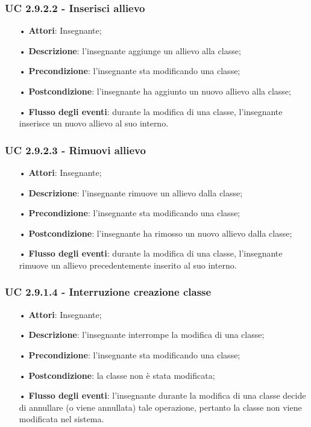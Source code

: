 \subsubsection{UC 2.9.2.2 - Inserisci allievo}
\begin{itemize}
	\item[•] \textbf{Attori}: Insegnante;
	\item[•] \textbf{Descrizione}: l'insegnante aggiunge un allievo alla classe;
	\item[•] \textbf{Precondizione}: l'insegnante sta modificando una classe;
	\item[•] \textbf{Postcondizione}: l'insegnante ha aggiunto un nuovo allievo alla classe;
	\item[•] \textbf{Flusso degli eventi}: durante la modifica di una classe, l'insegnante inserisce un nuovo allievo al suo interno.
\end{itemize}

\subsubsection{UC 2.9.2.3 - Rimuovi allievo}
\begin{itemize}
	\item[•] \textbf{Attori}: Insegnante;
	\item[•] \textbf{Descrizione}: l'insegnante rimuove un allievo dalla classe;
	\item[•] \textbf{Precondizione}: l'insegnante sta modificando una classe;
	\item[•] \textbf{Postcondizione}: l'insegnante ha rimosso un nuovo allievo dalla classe;
	\item[•] \textbf{Flusso degli eventi}: durante la modifica di una classe, l'insegnante rimuove un allievo precedentemente inserito al suo interno.
\end{itemize}

\subsubsection{UC 2.9.1.4 - Interruzione creazione classe}
\begin{itemize}
	\item[•] \textbf{Attori}: Insegnante;
	\item[•] \textbf{Descrizione}: l'insegnante interrompe la modifica di una classe;
	\item[•] \textbf{Precondizione}: l'insegnante sta modificando una classe;
	\item[•] \textbf{Postcondizione}: la classe non è stata modificata;
	\item[•] \textbf{Flusso degli eventi}: l'insegnante durante la modifica di una classe decide di annullare (o viene annullata) tale operazione, pertanto la classe non viene modificata nel sistema.
\end{itemize}


